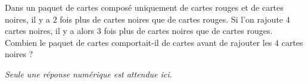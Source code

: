 Dans un paquet de cartes composé uniquement de cartes rouges et de cartes noires, il y a $2$ fois plus de cartes noires que de cartes rouges. Si l'on rajoute $4$ cartes noires, il y a alors $3$ fois plus de cartes noires que de cartes rouges. Combien le paquet de cartes comportait-il de cartes avant de rajouter les $4$ cartes noires ? 

\emph{Seule une réponse numérique est attendue ici.}